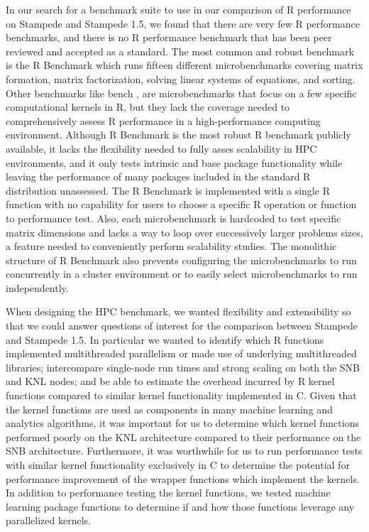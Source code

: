In our search for a benchmark suite to use in our comparison of R performance on
Stampede and Stampede 1.5, we found that there are very few R performance benchmarks, and
there is no R performance benchmark that has been peer reviewed and accepted as a
standard. The most common and robust benchmark is the R Benchmark
\cite{urbanek:Rbenchmarks} which runs fifteen different microbenchmarks covering matrix
formation, matrix factorization, solving linear systems of equations, and sorting. Other
benchmarks like bench \cite{urbanek:Rbenchmarks}, are microbenchmarks that
focus on a few specific computational kernels in R, but they lack the coverage needed to
comprehensively assess R performance in a high-performance computing environment.
Although R Benchmark is the most robust R benchmark publicly available, it lacks the
flexibility needed to fully asses scalability in HPC environments, and it only tests
intrinsic and base package functionality while leaving the performance of many packages
included in the standard R distribution unassessed.
The R Benchmark is implemented with a single R function with no capability for users to choose
a specific R operation or function to performance test.
Also, each microbenchmark is hardcoded to test specific matrix dimensions and lacks a way
to loop over successively larger problems sizes, a feature needed to conveniently perform
scalability studies.
The monolithic structure of R Benchmark also prevents configuring the microbenchmarks to
run concurrently in a cluster environment or to easily select microbenchmarks to run
independently.

When designing the HPC benchmark, we wanted flexibility and extensibility so that
we could answer questions of interest for the comparison between
Stampede and Stampede 1.5. In particular we wanted to identify which R functions 
implemented multithreaded parallelism or made use of underlying multithreaded
libraries; intercompare single-node run times and strong scaling on both the SNB
and KNL nodes; and be able to estimate the overhead incurred by R kernel
functions compared to similar kernel functionality implemented in C. Given that the kernel
functions are used as components in many machine learning and analytics algorithms, it was
important for us to determine which kernel functions performed poorly on the KNL
architecture compared to their performance on the SNB architecture. Furthermore, it was
worthwhile for us to run performance tests with similar kernel functionality exclusively
in C to determine the potential for performance improvement of the wrapper functions which
implement the kernels. In addition to performance testing the kernel functions, we tested
machine learning package functions to determine if and how those functions leverage any
parallelized kernels.

